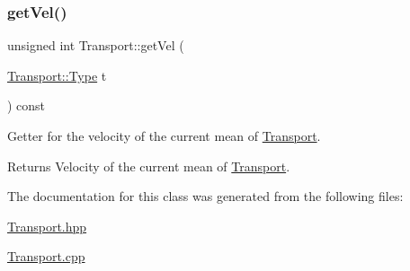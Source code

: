 \subsubsection{\texorpdfstring{get\+Vel()}{getVel()}}
{\footnotesize\ttfamily unsigned int Transport\+::get\+Vel (\begin{DoxyParamCaption}\item[{\hyperlink{class_transport_a1879cecfed0d4238e5a7af6d085db317}{Transport\+::\+Type}}]{t }\end{DoxyParamCaption}) const}

Getter for the velocity of the current mean of \hyperlink{class_transport}{Transport}.

\begin{DoxyReturn}{Returns}
Velocity of the current mean of \hyperlink{class_transport}{Transport}. 
\end{DoxyReturn}


The documentation for this class was generated from the following files\+:\begin{DoxyCompactItemize}
\item 
\hyperlink{_transport_8hpp}{Transport.\+hpp}\item 
\hyperlink{_transport_8cpp}{Transport.\+cpp}\end{DoxyCompactItemize}
